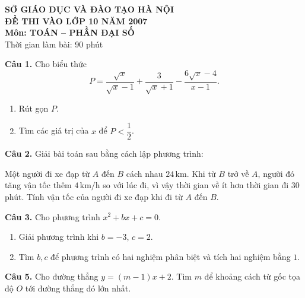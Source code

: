 \documentclass[12pt,a4paper]{article}
\begin{document}
\begin{center}
{\large\bfseries SỞ GIÁO DỤC VÀ ĐÀO TẠO HÀ NỘI}\\[4pt]
{\Large\bfseries ĐỀ THI VÀO LỚP 10 NĂM 2007}\\[2pt]
{\bfseries Môn: TOÁN -- PHẦN ĐẠI SỐ}\\
Thời gian làm bài: 90 phút
\end{center}
\textbf{Câu 1.} Cho biểu thức
\[
P=\frac{\sqrt{x}}{\sqrt{x}-1}+\frac{3}{\sqrt{x}+1}-\frac{6\sqrt{x}-4}{x-1}.
\]
\begin{enumerate}[label=\alph*)]
  \item Rút gọn $P$.
  \item Tìm các giá trị của $x$ để $P<\dfrac12$.
\end{enumerate}
\textbf{Câu 2.} Giải bài toán sau bằng cách lập phương trình:

Một người đi xe đạp từ $A$ đến $B$ cách nhau $24\,\mathrm{km}$. Khi từ $B$ trở về $A$, người đó tăng vận tốc thêm $4\,\mathrm{km/h}$ so với lúc đi, vì vậy thời gian về ít hơn thời gian đi 30 phút. Tính vận tốc của người đi xe đạp khi đi từ $A$ đến $B$.

\textbf{Câu 3.} Cho phương trình $x^2+bx+c=0$.
\begin{enumerate}[label=\alph*)]
  \item Giải phương trình khi $b=-3$, $c=2$.
  \item Tìm $b,c$ để phương trình có hai nghiệm phân biệt và tích hai nghiệm bằng $1$.
\end{enumerate}
\textbf{Câu 5.} Cho đường thẳng $y=(m-1)x+2$. Tìm $m$ để khoảng cách từ gốc tọa độ $O$ tới đường thẳng đó lớn nhất.
\end{document}
